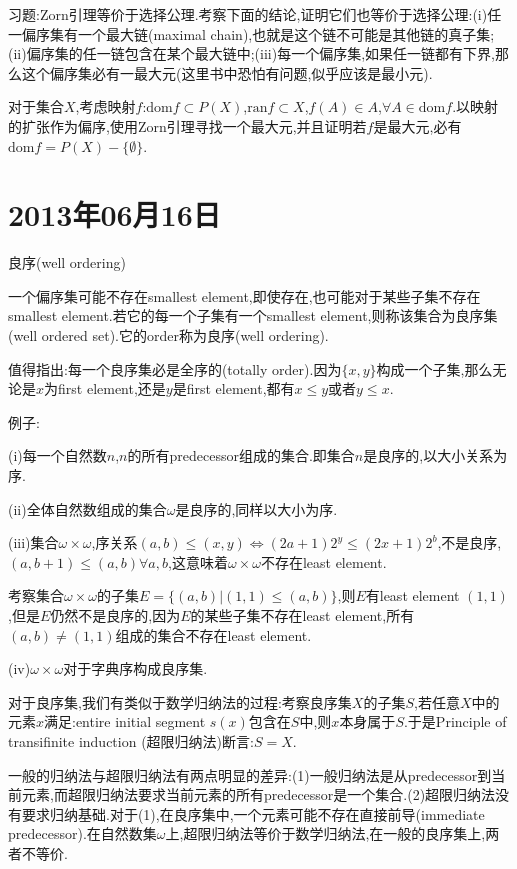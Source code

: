 \documentclass[12pt,a4paper,openany]{book}
\begin{document}
习题:Zorn引理等价于选择公理.考察下面的结论,证明它们也等价于选择公理:(i)任一偏序集有一个最大链(maximal chain),也就是这个链不可能是其他链的真子集;(ii)偏序集的任一链包含在某个最大链中;(iii)每一个偏序集,如果任一链都有下界,那么这个偏序集必有一最大元(这里书中恐怕有问题,似乎应该是最小元).

对于集合$X$,考虑映射$f$:$\text{dom}{f} \subset P(X)$,$\text{ran}{f} \subset X$,$f(A) \in A$,$\forall A \in \text{dom}{f}$.以映射的扩张作为偏序,使用Zorn引理寻找一个最大元,并且证明若$f$是最大元,必有$\text{dom}{f} = P(X)-\{\emptyset\}$.

\section{2013年06月16日}
良序(well ordering)

一个偏序集可能不存在smallest element,即使存在,也可能对于某些子集不存在smallest element.若它的每一个子集有一个smallest element,则称该集合为良序集(well ordered set).它的order称为良序(well ordering).

值得指出:每一个良序集必是全序的(totally order).因为$\{x,y\}$构成一个子集,那么无论是$x$为first element,还是$y$是first element,都有$x \le y$或者$y \le x$.

例子:

(i)每一个自然数$n$,$n$的所有predecessor组成的集合.即集合$n$是良序的,以大小关系为序.

(ii)全体自然数组成的集合$\omega$是良序的,同样以大小为序.

(iii)集合$\omega \times \omega$,序关系$(a,b) \le (x,y)$$\Leftrightarrow$$(2a+1)2^y \le (2x+1)2^b$,不是良序,$(a,b+1) \le (a,b)$$\forall a,b$,这意味着$\omega \times \omega$不存在least element.

考察集合$\omega \times \omega$的子集$E = \{(a,b) | (1,1) \le (a,b)\}$,则$E$有least element $(1,1)$,但是$E$仍然不是良序的,因为$E$的某些子集不存在least element,所有$(a,b) \neq (1,1)$组成的集合不存在least element.

(iv)$\omega \times \omega$对于字典序构成良序集.

对于良序集,我们有类似于数学归纳法的过程:考察良序集$X$的子集$S$,若任意$X$中的元素$x$满足:entire initial segment $s(x)$包含在$S$中,则$x$本身属于$S$.于是Principle of transifinite induction (超限归纳法)断言:$S=X$.

一般的归纳法与超限归纳法有两点明显的差异:(1)一般归纳法是从predecessor到当前元素,而超限归纳法要求当前元素的所有predecessor是一个集合.(2)超限归纳法没有要求归纳基础.对于(1),在良序集中,一个元素可能不存在直接前导(immediate predecessor).在自然数集$\omega$上,超限归纳法等价于数学归纳法,在一般的良序集上,两者不等价.
\end{document}
